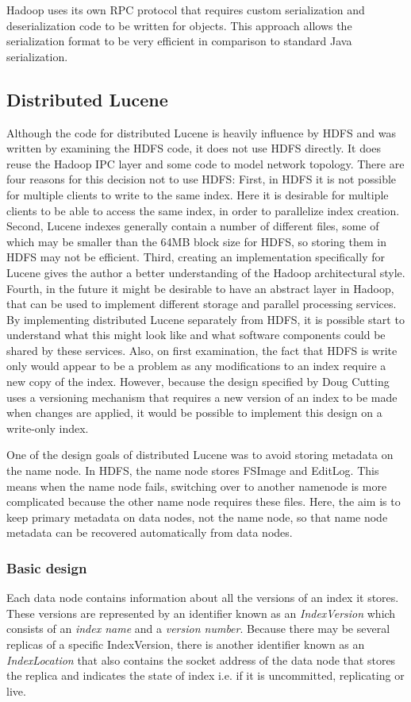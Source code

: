 \documentclass[a4paper,10pt]{article}
\begin{document}
Hadoop uses its own RPC protocol that requires custom serialization and deserialization code to be written for objects. This approach allows the serialization format to be very efficient in comparison to standard Java serialization. 

\subsection{Distributed Lucene}
Although the code for distributed Lucene is heavily influence by HDFS and was written by examining the HDFS code, it does not use HDFS directly. It does reuse the Hadoop IPC layer and some code to model network topology. There are four reasons for this decision not to use HDFS: First, in HDFS it is not possible for multiple clients to write to the same index. Here it is desirable for multiple clients to be able to access the same index, in order to parallelize index creation. Second, Lucene indexes generally contain a number of different files, some of which may be smaller than the 64MB block size for HDFS, so storing them in HDFS may not be efficient. Third, creating an implementation specifically for Lucene gives the author a better understanding of the Hadoop architectural style. Fourth, in the future it might be desirable to have an abstract layer in Hadoop, that can be used to implement different storage and parallel processing services. By implementing distributed Lucene separately from HDFS, it is possible start to understand what this might look like and what software components could be shared by these services. Also, on first examination, the fact that HDFS is write only would appear to be a problem as any modifications to an index require a new copy of the index. However, because the design specified by Doug Cutting \cite{cutting2006} uses a versioning mechanism that requires a new version of an index to be made when changes are applied, it would be possible to implement this design on a write-only index. 

One of the design goals of distributed Lucene was to avoid storing metadata on the name node. In HDFS, the name node stores FSImage and EditLog. This means when the name node fails, switching over to another namenode is more complicated because the other name node requires these files. Here, the aim is to keep primary metadata on data nodes, not the name node, so that name node metadata can be recovered automatically from data nodes. 

\subsubsection{Basic design}
Each data node contains information about all the versions of an index it stores. These versions are represented by an identifier known as an \emph{IndexVersion} which consists of an \emph{index name} and a \emph{version number}. Because there may be several replicas of a specific IndexVersion, there is another identifier known as an \emph{IndexLocation} that also contains the socket address of the data node that stores the replica and indicates the state of index i.e. if it is uncommitted, replicating or live. 
\end{document}
